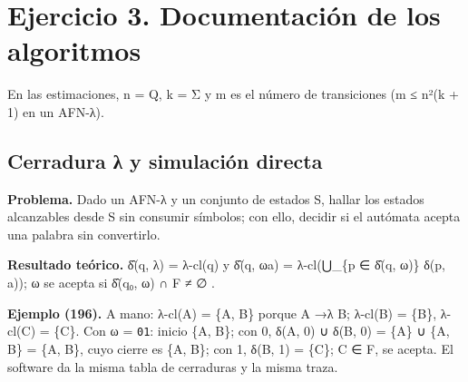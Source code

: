 \hypertarget{ejercicio-3.-documentaciuxf3n-de-los-algoritmos}{%
\section{Ejercicio 3. Documentación de los algoritmos}\label{ejercicio-3.-documentaciuxf3n-de-los-algoritmos}}

En las estimaciones, n = \textbar Q\textbar, k = \textbar Σ\textbar{} y m es el número de transiciones (m ≤ n²(k + 1) en un AFN-λ).

\hypertarget{cerradura-ux3bb-y-simulaciuxf3n-directa}{%
\subsection{Cerradura λ y simulación directa}\label{cerradura-ux3bb-y-simulaciuxf3n-directa}}

\textbf{Problema.} Dado un AFN-λ y un conjunto de estados S, hallar los estados alcanzables desde S sin consumir símbolos; con ello, decidir si el autómata acepta una palabra sin convertirlo.

\textbf{Resultado teórico.} δ̂(q, λ) = λ-cl(q) y δ̂(q, ωa) = λ-cl(⋃\_\{p ∈ δ̂(q, ω)\} δ(p, a)); ω se acepta si δ̂(q₀, ω) ∩ F ≠ ∅ \autocite[sec.~2.5.3--2.5.4]{hopcroft2007}.

\begin{Shaded}
\begin{Highlighting}[]

\end{Highlighting}
\end{Shaded}

\textbf{Ejemplo (196).} A mano: λ-cl(A) = \{A, B\} porque A →λ B; λ-cl(B) = \{B\}, λ-cl(C) = \{C\}. Con ω = \texttt{01}: inicio \{A, B\}; con 0, δ(A, 0) ∪ δ(B, 0) = \{A\} ∪ \{A, B\} = \{A, B\}, cuyo cierre es \{A, B\}; con 1, δ(B, 1) = \{C\}; C ∈ F, se acepta. El software da la misma tabla de cerraduras y la misma traza.


